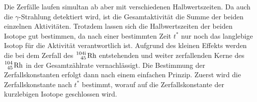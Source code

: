 Die Zerfälle laufen simultan ab aber mit verschiedenen Halbwertszeiten. Da auch die $\gamma$-Strahlung detektiert wird, ist die Gesamtaktivität die Summe der beiden einzelnen Aktivitäten.
Trotzdem lassen sich die Halbwertszeiten der beiden Isotope gut bestimmen, da nach einer bestimmten Zeit $t^*$ nur noch das langlebige Isotop für die Aktivität verantwortlich ist.
Aufgrund des kleinen Effekts werden die bei dem Zerfall des $\ce{^{104\text{i}}_45 Rh}$ entstehenden und weiter zerfallenden Kerne des $\ce{^104_45 Rh}$ in der Gesamtzählrate vernachlässigt. 
Die Bestimmung der Zerfallskonstanten erfolgt dann nach einem einfachen Prinzip. Zuerst wird die Zerfallskonstante nach $t^*$ bestimmt, worauf auf die Zerfallskonstante der kurzlebigen Isotope geschlossen wird.